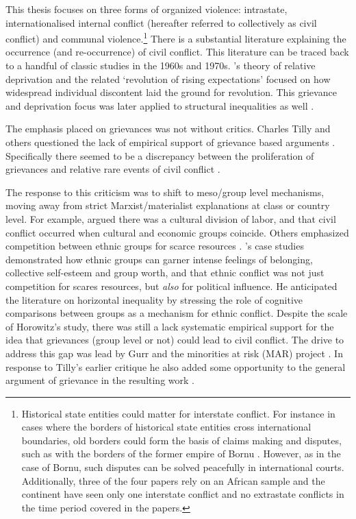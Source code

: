 \documentclass[12pt]{article}
\begin{document}
This thesis focuses on three forms of organized violence: intrastate,
internationalised internal conflict (hereafter referred to collectively as civil
conflict) and communal violence.\footnote{Historical state entities could matter
	for interstate conflict. For instance in cases where the borders of
	historical state entities cross international boundaries, old borders
	could form the basis of claims making and disputes, such as with the
	borders of the former empire of Bornu \citep{Hariri2012}. However, as in
	the case of Bornu, such disputes can be solved peacefully in
	international courts. Additionally, three of the four papers rely on an
	African sample and the continent have seen only one interstate conflict
and no extrastate conflicts in the time period covered in the papers.} There is
a substantial literature explaining the occurrence (and re-occurrence) of civil
conflict. This literature can be traced back to a handful of classic studies in
the 1960s and 1970s. \citet{GurrTedRobert1970Wmr}'s theory of relative
deprivation and the related `revolution of rising expectations'
\citep{Davies_1962} focused on how widespread individual discontent laid the
ground for revolution. This grievance and deprivation focus was later applied to
structural inequalities as well \citep{Muller_1985, Muller_1987,
ScottJamesC1977TMEo}. 

The emphasis placed on grievances was not without critics. Charles Tilly and
others questioned the lack of empirical support of grievance based arguments
\citep{Oberschall_1978, Brush_1996}. Specifically there seemed to be a
discrepancy between the proliferation of grievances and relative rare events of
civil conflict \citep{Snyder_1972, TillyCharles1978Fmtr, Skocpol_1979}. 

The response to this criticism was to shift to meso/group level mechanisms,
moving away from strict Marxist/materialist explanations at class or country
level. For example, \citet{Hechter_1978} argued there was a cultural division of
labor, and that civil conflict occurred when cultural and economic groups
coincide. Others emphasized competition between ethnic groups for scarce
resources \citep{barth1969}. \citet{Horowitz1985}'s case studies demonstrated
how ethnic groups can garner intense feelings of belonging, collective
self-esteem and group worth, and that ethnic conflict was not just competition
for scares resources, but \textit{also} for political influence. He anticipated
the literature on horizontal inequality by stressing the role of cognitive
comparisons between groups as a mechanism for ethnic conflict. Despite the scale
of Horowitz's study, there was still a lack systematic empirical support for the
idea that grievances (group level or not) could lead to civil conflict. The
drive to address this gap was lead by Gurr and the minorities at risk (MAR)
project \citet{GurrTedRobert1993Mar:}. In response to Tilly's earlier
critique he also added some opportunity to the general argument of grievance in
the resulting work \citep{Gurr_1993}. 
\end{document}
